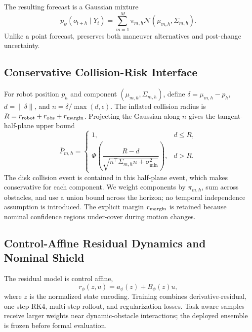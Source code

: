 \documentclass[conference]{IEEEtran}
\newcommand{\reviewbox}[2]{%
    \begingroup
    \setlength{\fboxsep}{0.35pt}%
    \setlength{\fboxrule}{0.45pt}%
    \hyperref[#1]{\fcolorbox{red}{white}{\vphantom{I}#2}}%
    \endgroup}
\newcommand{\revieweqref}[1]{\reviewbox{#1}{\textup{(\ref*{#1})}}}
\newcommand{\revieweqref}[1]{\eqref{#1}}
\begin{document}
The resulting forecast is a Gaussian mixture
\begin{equation}
 p_\psi(o_{t+h}\mid Y_t)=\sum_{m=1}^{M}\pi_{m,h}
 \mathcal{N}(\mu_{m,h},\Sigma_{m,h}).
 \label{eq:mixture}
\end{equation}
Unlike a point forecast, \revieweqref{eq:mixture} preserves both maneuver alternatives and post-change uncertainty.

\subsection{Conservative Collision-Risk Interface}

For robot position $p_h$ and component $(\mu_{m,h},\Sigma_{m,h})$, define $\delta=\mu_{m,h}-p_h$, $d=\|\delta\|$, and $n=\delta/\max(d,\epsilon)$. The inflated collision radius is
$R=r_{\rm robot}+r_{\rm obs}+r_{\rm margin}$. Projecting the Gaussian along $n$ gives the tangent-half-plane upper bound
\begin{equation}
\bar{P}_{m,h}=
\begin{cases}
1, & d\le R,\\
\Phi\!\left(\dfrac{R-d}{\sqrt{n^\top\Sigma_{m,h}n+\sigma_{\min}^2}}\right), & d>R.
\end{cases}
\label{eq:riskbound}
\end{equation}
The disk collision event is contained in this half-plane event, which makes \revieweqref{eq:riskbound} conservative for each component. We weight components by $\pi_{m,h}$, sum across obstacles, and use a union bound across the horizon; no temporal independence assumption is introduced. The explicit margin $r_{\rm margin}$ is retained because nominal confidence regions under-cover during motion changes.

\subsection{Control-Affine Residual Dynamics and Nominal Shield}

The residual model is control affine,
\begin{equation}
    r_\phi(z,u)=a_\phi(z)+B_\phi(z)u,
    \label{eq:icode}
\end{equation}
where $z$ is the normalized state encoding. Training combines derivative-residual, one-step RK4, multi-step rollout, and regularization losses. Task-aware samples receive larger weights near dynamic-obstacle interactions; the deployed ensemble is frozen before formal evaluation.
\end{document}
